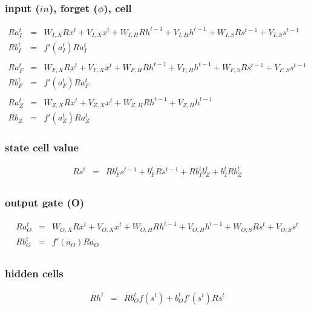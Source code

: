 \documentclass{article}
\begin{document}
\subsubsection{input ($in$), forget ($\phi$), cell}
\begin{eqnarray*}
Ra_{I}^t &=& W_{I,X}Rx^t + V_{I,X}x^t + W_{I,H}Rh^{t-1} + V_{I,H}h^{t-1} + W_{I,S}Rs^{t-1} + V_{I,S}s^{t-1}\\
Rb_{I}^t &=& f'(a_{I}^t)Ra_{I}^t \\
\\
Ra_{F}^t &=& W_{F,X}Rx^t + V_{F,X}x^t + W_{F, H}Rh^{t-1} + V_{F, H}h^{t-1} + W_{F, S}Rs^{t-1} + V_{F, S}s^{t-1} \\
Rb_{F}^t &=& f'(a_{F}^t) Ra_{F}^t \\
\\
Ra_{Z}^t &=& W_{Z,X}Rx^t + V_{Z,X}x^t + W_{Z,H} Rh^{t-1} + V_{Z,H} h^{t-1} \\
Rb_{Z} &=& f'(a_{Z}^t) Ra_{Z}^t 
\end{eqnarray*}


\subsubsection{state cell value}
\begin{eqnarray*}
Rs^t &=& Rb_{F}^ts^{t-1} + b_{F}^tRs^{t-1} + Rb_{I}^t b_Z^t + b_{I}^t Rb_Z^t \\  
\end{eqnarray*}

\subsubsection{output gate (O)}
\begin{eqnarray*}
Ra_{O}^t &=& W_{O,X}Rx^t + V_{O,X}x^t + W_{O,H}Rh^{t-1} + V_{O,H}h^{t-1} + W_{O,S}Rs^t + V_{O,S}s^t \\
Rb_{O}^t &=& f'(a_{O})Ra_{O} \\
\end{eqnarray*}

\subsubsection{hidden cells}
\begin{eqnarray*}
Rh^t &=& Rb_{O}^t f(s^t) + b_{O}^t f'(s^t)Rs^t \\
\end{eqnarray*}

\end{document}
